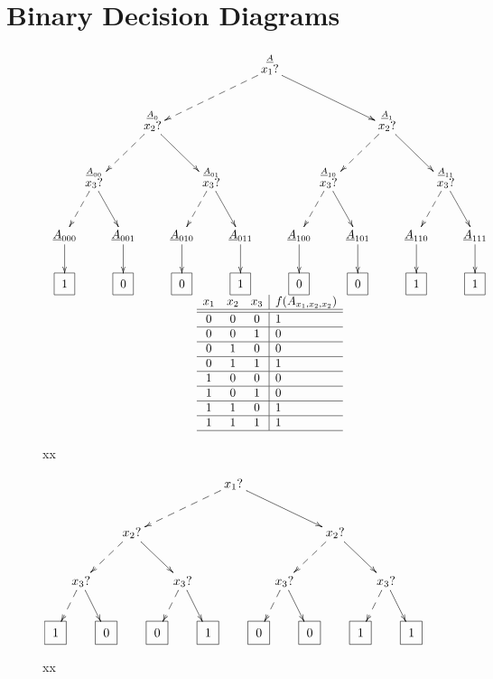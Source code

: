 \chapter{Binary Decision Diagrams}\label{ch-binarydd}

\begin{figure}[h!]
$$
\begin{array}{c}
\xymatrix@C=.1pc{
&&&&&&&\stackrel{\rvA}{x_1?}\ar@{-->}[dllll]
\ar[drrrr]
\\
&&&\stackrel{\rvA_0}{x_2?}\ar@{-->}[dll]\ar[drr]
&&&&&&&&\stackrel{\rvA_1} {x_2?}\ar@{-->}[dll]\ar[drr]
\\
&\stackrel{\rvA_{00}}{ x_3?}\ar@{-->}[dl]\ar[dr]
&&&&\stackrel{\rvA_{01}} {x_3?}\ar@{-->}[dl]\ar[dr]
&&&&\stackrel{\rvA_{10}}{ x_3?}\ar@{-->}[dl]\ar[dr]
&&&&\stackrel{\rvA_{11}}{x_3?}\ar@{-->}[dl]\ar[dr]
\\
\rvA_{000}\ar[d]
&&\rvA_{001}\ar[d]
&&\rvA_{010}\ar[d]
&&\rvA_{011}\ar[d]
&&\rvA_{100}\ar[d]
&&\rvA_{101}\ar[d]
&&\rvA_{110}\ar[d]
&&\rvA_{111}\ar[d]
\\
\Rect{1}
&&\Rect{0}
&&\Rect{0}
&&\Rect{1}
&&\Rect{0}
&&\Rect{0}
&&\Rect{1}
&&\Rect{1}
}
\\
\begin{array}{ccc|l}
x_1&x_2&x_3&f(A_{x_1,x_2,x_2})
\\ \hline\hline
0
&0
&0
&1
\\ \hline
0
&0
&1
&0
\\ \hline
0
&1
&0
&0
\\ \hline
0
&1
&1
&1
\\ \hline
1
&0
&0
&0
\\ \hline
1
&0
&1
&0
\\ \hline
1
&1
&0
&1
\\ \hline
1
&1
&1
&1
\\ \hline
\end{array}
\end{array}
$$
\caption{xx}
\label{fig-bdd-tree}
\end{figure}

\begin{figure}[h!]
$$
\xymatrix@C=.1pc{
&&&&&&&x_1?\ar@{-->}[dllll]
\ar[drrrr]
\\
&&&x_2?\ar@{-->}[dll]\ar[drr]
&&&&&&&&x_2?\ar@{-->}[dll]\ar[drr]
\\
&x_3?\ar@{-->}[dl]\ar[dr]
&&&&x_3?\ar@{-->}[dl]\ar[dr]
&&&&x_3?\ar@{-->}[dl]\ar[dr]
&&&&x_3?\ar@{-->}[dl]\ar[dr]
\\
\Rect{1}
&&\Rect{0}
&&\Rect{0}
&&\Rect{1}
&&\Rect{0}
&&\Rect{0}
&&\Rect{1}
&&\Rect{1}
}
$$
\caption{xx}
\label{fig-bdd-tree-simp}
\end{figure}

